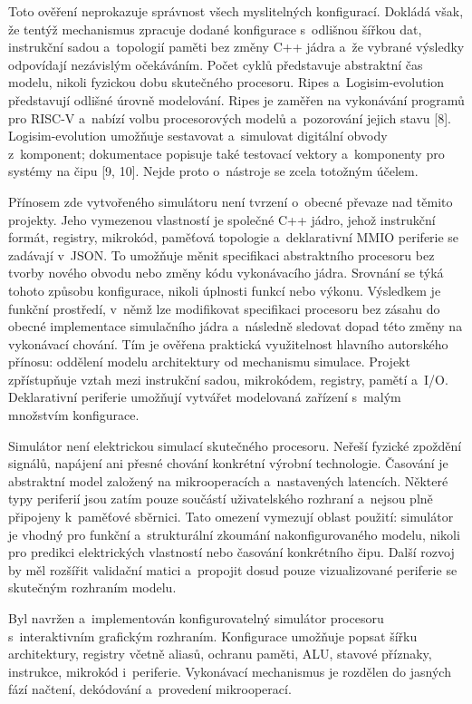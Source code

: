 \documentclass[hidelinks, 12pt]{article}%
\begin{document}
Toto ověření neprokazuje správnost všech myslitelných konfigurací. Dokládá však, že tentýž mechanismus zpracuje dodané konfigurace s~odlišnou šířkou dat, instrukční sadou a~topologií paměti bez změny C++ jádra a~že vybrané výsledky odpovídají nezávislým očekáváním. Počet cyklů představuje abstraktní čas modelu, nikoli fyzickou dobu skutečného procesoru.
Ripes a~Logisim-evolution představují odlišné úrovně modelování. Ripes je zaměřen na vykonávání programů pro RISC-V a~nabízí volbu procesorových modelů a~pozorování jejich stavu [8]. Logisim-evolution umožňuje sestavovat a~simulovat digitální obvody z~komponent; dokumentace popisuje také testovací vektory a~komponenty pro systémy na čipu [9, 10]. Nejde proto o~nástroje se zcela totožným účelem.

Přínosem zde vytvořeného simulátoru není tvrzení o~obecné převaze nad těmito projekty. Jeho vymezenou vlastností je společné C++ jádro, jehož instrukční formát, registry, mikrokód, paměťová topologie a~deklarativní MMIO periferie se zadávají v~JSON. To umožňuje měnit specifikaci abstraktního procesoru bez tvorby nového obvodu nebo změny kódu vykonávacího jádra. Srovnání se týká tohoto způsobu konfigurace, nikoli úplnosti funkcí nebo výkonu.
Výsledkem je funkční prostředí, v~němž lze modifikovat specifikaci procesoru bez zásahu do obecné implementace simulačního jádra a~následně sledovat dopad této změny na vykonávací chování. Tím je ověřena praktická využitelnost hlavního autorského přínosu: oddělení modelu architektury od mechanismu simulace. Projekt zpřístupňuje vztah mezi instrukční sadou, mikrokódem, registry, pamětí a~I/O. Deklarativní periferie umožňují vytvářet modelovaná zařízení s~malým množstvím konfigurace.

Simulátor není elektrickou simulací skutečného procesoru. Neřeší fyzické zpoždění signálů, napájení ani přesné chování konkrétní výrobní technologie. Časování je abstraktní model založený na mikrooperacích a~nastavených latencích. Některé typy periferií jsou zatím pouze součástí uživatelského rozhraní a~nejsou plně připojeny k~paměťové sběrnici. Tato omezení vymezují oblast použití: simulátor je vhodný pro funkční a~strukturální zkoumání nakonfigurovaného modelu, nikoli pro predikci elektrických vlastností nebo časování konkrétního čipu. Další rozvoj by měl rozšířit validační matici a~propojit dosud pouze vizualizované periferie se skutečným rozhraním modelu.

Byl navržen a~implementován konfigurovatelný simulátor procesoru s~interaktivním grafickým rozhraním. Konfigurace umožňuje popsat šířku architektury, registry včetně aliasů, ochranu paměti, ALU, stavové příznaky, instrukce, mikrokód i~periferie. Vykonávací mechanismus je rozdělen do jasných fází načtení, dekódování a~provedení mikrooperací.
\end{document}

